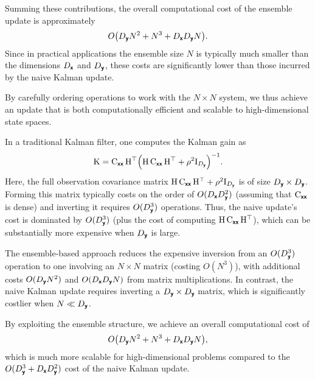 \documentclass[wcp]{jmlr} %
\begin{document}
Summing these contributions, the overall computational cost of the ensemble update is approximately
\[
    O\bigl(D_{\boldsymbol{\mathsf{y}}}N^2 + N^3 + D_{\boldsymbol{\mathsf{x}}}D_{\boldsymbol{\mathsf{y}}}N\bigr).
\]
Since in practical applications the ensemble size \(N\) is typically much smaller than the dimensions \(D_{\boldsymbol{\mathsf{x}}}\) and \(D_{\boldsymbol{\mathsf{y}}}\), these costs are significantly lower than those incurred by the naive Kalman update.

By carefully ordering operations to work with the \(N\times N\) system, we thus achieve an update that is both computationally efficient and scalable to high-dimensional state spaces.

In a traditional Kalman filter, one computes the Kalman gain as
\[
\mathrm{K} = \mathrm{C}_{\boldsymbol{\mathsf{xx}}}\,\mathrm{H}^\top \Bigl(\mathrm{H}\,\mathrm{C}_{\boldsymbol{\mathsf{xx}}}\,\mathrm{H}^\top + \rho^2\mathrm{I}_{D_{\boldsymbol{\mathsf{y}}}}\Bigr)^{-1}.
\]
Here, the full observation covariance matrix \(\mathrm{H}\,\mathrm{C}_{\boldsymbol{\mathsf{xx}}}\,\mathrm{H}^\top + \rho^2\mathrm{I}_{D_{\boldsymbol{\mathsf{y}}}}\) is of size \(D_{\boldsymbol{\mathsf{y}}}\times D_{\boldsymbol{\mathsf{y}}}\). Forming this matrix typically costs on the order of \(O(D_{\boldsymbol{\mathsf{x}}}D_{\boldsymbol{\mathsf{y}}}^2)\) (assuming that \(\mathrm{C}_{\boldsymbol{\mathsf{xx}}}\) is dense) and inverting it requires \(O(D_{\boldsymbol{\mathsf{y}}}^3)\) operations. Thus, the naive update's cost is dominated by \(O(D_{\boldsymbol{\mathsf{y}}}^3)\) (plus the cost of computing \(\mathrm{H}\,\mathrm{C}_{\boldsymbol{\mathsf{xx}}}\,\mathrm{H}^\top\)), which can be substantially more expensive when \(D_{\boldsymbol{\mathsf{y}}}\) is large.

The ensemble-based approach reduces the expensive inversion from an \(O(D_{\boldsymbol{\mathsf{y}}}^3)\) operation to one involving an \(N\times N\) matrix (costing \(O(N^3)\)), with additional costs \(O(D_{\boldsymbol{\mathsf{y}}}N^2)\) and \(O(D_{\boldsymbol{\mathsf{x}}}D_{\boldsymbol{\mathsf{y}}}N)\) from matrix multiplications. In contrast, the naive Kalman update requires inverting a \(D_{\boldsymbol{\mathsf{y}}}\times D_{\boldsymbol{\mathsf{y}}}\) matrix, which is significantly costlier when \(N \ll D_{\boldsymbol{\mathsf{y}}}\).

By exploiting the ensemble structure, we achieve an overall computational cost of
\[
    O\bigl(D_{\boldsymbol{\mathsf{y}}}N^2 + N^3 + D_{\boldsymbol{\mathsf{x}}}D_{\boldsymbol{\mathsf{y}}}N\bigr),
\]
which is much more scalable for high-dimensional problems compared to the \(O(D_{\boldsymbol{\mathsf{y}}}^3 + D_{\boldsymbol{\mathsf{x}}}D_{\boldsymbol{\mathsf{y}}}^2)\) cost of the naive Kalman update.
\end{document}
